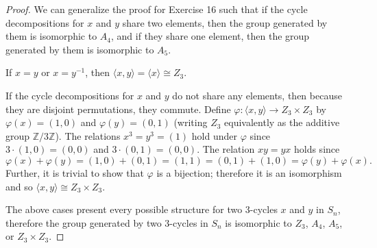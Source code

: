 \documentclass{article}
\begin{document}
\begin{proof}
    We can generalize the proof for Exercise 16 such that if the cycle decompositions for $x$ and $y$ share two elements, then the group generated by them is isomorphic to $A_4$, and if they share one element, then the group generated by them is isomorphic to $A_5$.

    If $x = y$ or $x = y^{-1}$, then $\langle x, y \rangle = \langle x \rangle \cong Z_3$.

    If the cycle decompositions for $x$ and $y$ do not share any elements, then because they are disjoint permutations, they commute. Define $\varphi: \langle x, y \rangle \rightarrow Z_3 \times Z_3$ by $\varphi(x) = (1, 0)$ and $\varphi(y) = (0, 1)$ (writing $Z_3$ equivalently as the additive group $\mathbb{Z}/3\mathbb{Z}$). The relations $x^3 = y^3 = (1)$ hold under $\varphi$ since $3 \cdot (1, 0) = (0, 0)$ and $3 \cdot (0, 1) = (0, 0)$. The relation $xy = yx$ holds since
    \begin{equation*}
        \varphi(x) + \varphi(y) = (1, 0) + (0, 1) = (1, 1) = (0, 1) + (1, 0) = \varphi(y) + \varphi(x).
    \end{equation*}
    Further, it is trivial to show that $\varphi$ is a bijection; therefore it is an isomorphism and so $\langle x, y \rangle \cong Z_3 \times Z_3$.

    The above cases present every possible structure for two 3-cycles $x$ and $y$ in $S_n$, therefore the group generated by two 3-cycles in $S_n$ is isomorphic to $Z_3$, $A_4$, $A_5$, or $Z_3 \times Z_3$.
\end{proof}
\end{document}
